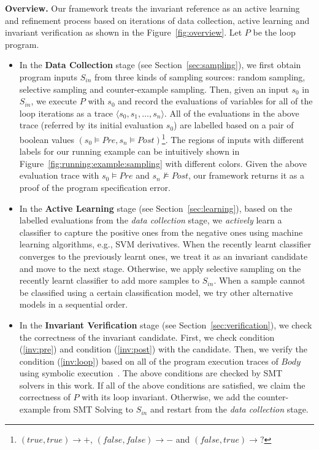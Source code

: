 \medskip\noindent
\textbf{Overview.}
Our framework treats the invariant reference as an active learning and refinement process 
based on iterations of data collection, active learning and invariant verification 
as shown in the Figure~\ref{fig:overview}. 
Let $P$ be the loop program. 
\begin{itemize}
    \item 
    In the \textbf{Data Collection} stage (see Section~\ref{sec:sampling}), 
    we first obtain program inputs $S_{\mathit{in}}$ from three kinds of sampling sources: 
    random sampling, selective sampling and counter-example sampling. 
    Then, given an input $s_0$ in $S_{\mathit{in}}$, we execute $P$ with $s_0$ 
    and record the evaluations of variables for all of the loop iterations
    as a trace $\langle s_0, s_1, \ldots, s_n \rangle$.  
    All of the evaluations in the above trace (referred by its initial evaluation $s_0$) 
    are labelled based on a pair of boolean values 
    $(s_0 \models \mathit{Pre}, s_n \models \mathit{Post})$\footnote{
        $(\mathit{true}, \mathit{true}) \rightarrow +$, 
        $(\mathit{false}, \mathit{false}) \rightarrow -$ 
        and $(\mathit{false}, \mathit{true}) \rightarrow ?$}. 
    The regions of inputs with different labels for our running example can be intuitively shown 
    in Figure~\ref{fig:running:example:sampling} with different colors. 
    Given the above evaluation trace with
    $s_0 \models \mathit{Pre}$ and $s_n \not\models \mathit{Post}$, 
    our framework returns it as a proof of the program specification error. 
    \item 
    In the \textbf{Active Learning} stage (see Section~\ref{sec:learning}), 
    based on the labelled evaluations from the \emph{data collection} stage, 
    we \emph{actively} learn a classifier to capture the positive ones from the negative ones 
    using machine learning algorithms, e.g., SVM derivatives. 
    When the recently learnt classifier converges to the previously learnt ones, 
    we treat it as an invariant candidate and move to the next stage. 
    Otherwise, we apply selective sampling on the recently learnt classifier 
    to add more samples to $S_{\mathit{in}}$. 
    When a sample cannot be classified using a certain classification model, 
    we try other alternative models in a sequential order. 
    \item 
    In the \textbf{Invariant Verification} stage (see Section~\ref{sec:verification}), 
    we check the correctness of the invariant candidate. 
    First, we check condition (\ref{inv:pre}) and condition (\ref{inv:post}) with the candidate. 
    Then, we verify the condition (\ref{inv:loop}) 
    based on all of the program execution traces of $\mathit{Body}$ using symbolic execution~\cite{}. 
    The above conditions are checked by SMT~\cite{barrett2009satisfiability} solvers in this work. 
    If all of the above conditions are satisfied, 
    we claim the correctness of $P$ with its loop invariant. 
    Otherwise, we add the counter-example from SMT Solving to $S_{\mathit{in}}$ 
    and restart from the \emph{data collection} stage. 
\end{itemize}
